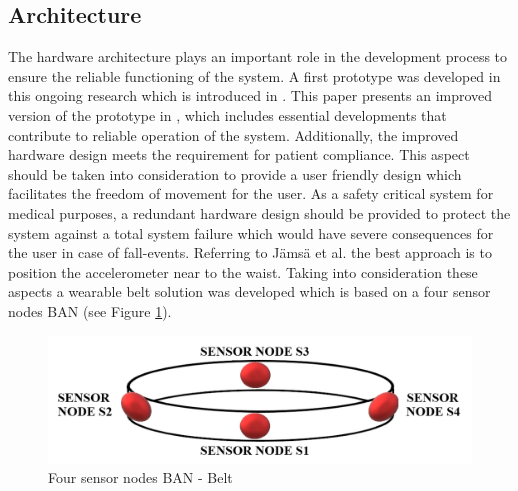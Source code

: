 \documentclass[review]{elsarticle}
\begin{document}
\subsection{Architecture}
\label{subsec:Architecture}	
The hardware architecture plays an important role in the development process to ensure the reliable functioning of the system. A first prototype was developed in this ongoing research which is introduced in \cite{LaBlunda.2016, LaBlunda.2016b}. This paper presents an improved version of the prototype in \cite{LaBlunda.2016, LaBlunda.2016b}, which includes essential developments that contribute to reliable operation of the system. Additionally, the improved hardware design meets the requirement for patient compliance. This aspect should be taken into consideration to provide a user friendly design which facilitates the freedom of movement for the user. As a safety critical system for medical purposes, a redundant hardware design should be provided to protect the system against a total system failure which would have severe consequences for the user in case of fall-events. Referring to J{\"a}ms{\"a} et al. \cite{jamsa2014fall} the best approach is to position the accelerometer near to the waist. Taking into consideration these aspects a wearable belt solution was developed which is based on a four sensor nodes BAN (see Figure \ref{fig:BanBelt}).
\begin{figure}[!ht]
	\centering
	\includegraphics[scale=0.415]{Images/belt}
	\caption[Four sensor nodes BAN - Belt]{Four sensor nodes BAN - Belt \cite{LaBlunda.2016, LaBlunda.2016b}}
	\label{fig:BanBelt}
\end{figure}
\end{document}
